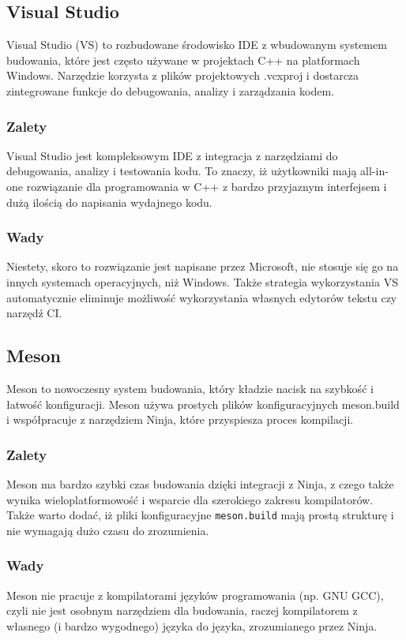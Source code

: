\subsection{Visual Studio}
Visual Studio (VS) to rozbudowane środowisko IDE z wbudowanym systemem budowania, które jest często używane w projektach C++ na platformach Windows. Narzędzie korzysta z plików projektowych .vcxproj i dostarcza zintegrowane funkcje do debugowania, analizy i zarządzania kodem.

\subsubsection{Zalety}
Visual Studio jest kompleksowym IDE z integracja z narzędziami do debugowania, analizy i testowania kodu. To znaczy, iż użytkowniki mają all-in-one rozwiązanie dla programowania w C++ z bardzo przyjaznym interfejsem i dużą ilością do napisania wydajnego kodu.

\subsubsection{Wady}
Niestety, skoro to rozwiązanie jest napisane przez Microsoft, nie stosuje się go na innych systemach operacyjnych, niż Windows. Także strategia wykorzystania VS automatycznie eliminuje możliwość wykorzystania własnych edytorów tekstu czy narzędź CI.

\subsection{Meson}
Meson to nowoczesny system budowania, który kładzie nacisk na szybkość i łatwość konfiguracji. Meson używa prostych plików konfiguracyjnych meson.build i współpracuje z narzędziem Ninja, które przyspiesza proces kompilacji.

\subsubsection{Zalety}
Meson ma bardzo szybki czas budowania dzięki integracji z Ninja, z czego także wynika wieloplatformowość i wsparcie dla szerokiego zakresu kompilatorów. Także warto dodać, iż  pliki konfiguracyjne \texttt{meson.build} mają prostą strukturę i nie wymagają dużo czasu do zrozumienia.

\subsubsection{Wady}
Meson nie pracuje z kompilatorami języków programowania (np. GNU GCC), czyli nie jest osobnym narzędziem dla budowania, raczej kompilatorem z własnego (i bardzo wygodnego) języka do języka, zrozumianego przez Ninja.

